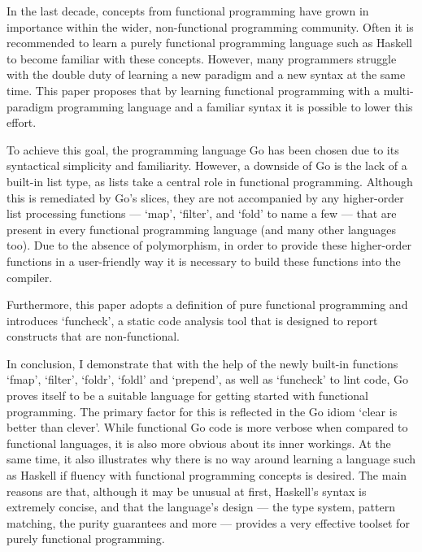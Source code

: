 
In the last decade, concepts from functional programming have grown in
importance within the wider, non-functional programming community.
Often it is recommended to learn a purely functional programming language
such as Haskell to become familiar with these concepts.
However, many programmers struggle with the double duty
of learning a new paradigm and a new syntax at the same time.
This paper proposes that by learning functional programming with a
multi-paradigm programming language and a familiar syntax it is possible
to lower this effort.

To achieve this goal, the programming language Go has been chosen due to
its syntactical simplicity and familiarity.
However, a downside of Go is the lack of a built-in list type, as lists take a
central role in functional programming. Although this is remediated by Go's slices,
they are not accompanied by any higher-order list processing functions --- `map', `filter', and `fold' to name a
few --- that are present in every functional programming language (and many
other languages too).
Due to the absence of polymorphism, in order to provide these higher-order functions in
a user-friendly way it is necessary to build these functions into the compiler.

Furthermore, this paper adopts a definition of pure functional programming and
introduces `funcheck', a static code analysis tool that is designed to
report constructs that are non-functional.

In conclusion, I demonstrate that with the help of the newly built-in
functions `fmap', `filter', `foldr', `foldl' and
`prepend', as well as `funcheck' to lint code, Go proves itself to be a
suitable language for getting started with functional programming.
The primary factor for this is reflected in the Go idiom `clear is better than clever'.
While functional Go code is more verbose when compared to functional languages, it
is also more obvious about its inner workings.
At the same time, it also illustrates why there is no way around learning a
language such as Haskell if fluency with functional programming concepts
is desired. The main reasons are that, although it may be unusual at first, Haskell's
syntax is extremely concise, and that the language's design --- the type system,
pattern matching, the purity guarantees and more --- provides a very effective toolset
for purely functional programming.
